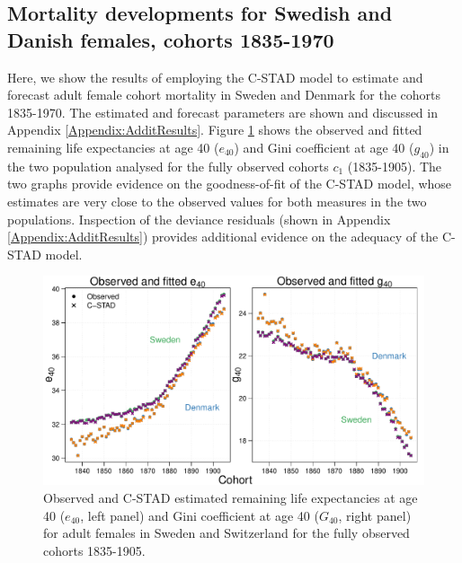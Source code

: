 \documentclass[11pt, a4paper]{article}
\begin{document}
\subsection{Mortality developments for Swedish and Danish females, cohorts 1835-1970}
\label{Subsec:ForecastC-STAD}
Here, we show the results of employing the C-STAD model to estimate and forecast adult female cohort mortality in Sweden and Denmark for the cohorts 1835-1970. The estimated and forecast parameters are  shown and discussed in Appendix \ref{Appendix:AdditResults}. Figure \ref{Fig:CSTADfitE40G40} shows the observed and fitted remaining life expectancies at age 40 ($e_{40}$) and Gini coefficient at age 40 ($g_{40}$) in the two population analysed for the fully observed cohorts $c_1$ (1835-1905). The two graphs provide evidence on the goodness-of-fit of the C-STAD model, whose estimates are very close to the observed values for both measures in the two populations. Inspection of the deviance residuals (shown in Appendix \ref{Appendix:AdditResults}) provides additional evidence on the adequacy of the C-STAD model. \par

\begin{figure}[t]
	\begin{center}
		\includegraphics[scale=0.57]{./Figures/F4.pdf} 
		\caption{Observed and C-STAD estimated remaining life expectancies at age 40 ($e_{40}$, left panel) and Gini coefficient at age 40 ($G_{40}$, right panel) for adult females in Sweden and Switzerland for the fully observed cohorts 1835-1905.\label{Fig:CSTADfitE40G40}}    
	\end{center}
\end{figure}
\end{document}
